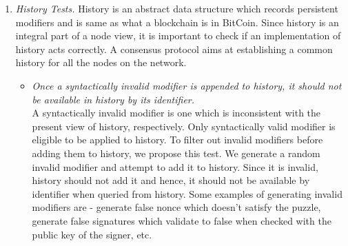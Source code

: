 \begin{enumerate}[\IEEEsetlabelwidth{Z}]
\item \textit{History Tests.}
History is an abstract data structure which records persistent modifiers and is same as what a blockchain is in BitCoin. Since history is an integral part of a node view, it is important to check if an implementation of history acts correctly. A consensus protocol aims at establishing a common history for all the nodes on the network.

\begin{itemize}[]
\item \textit{Once a syntactically invalid modifier is appended to history, it should not be available in history by its identifier.}\\
A syntactically invalid modifier is one which is inconsistent with the present view of history, respectively. Only syntactically valid modifier is eligible to be applied to history. To filter out invalid modifiers before adding them to history, we propose this test. We generate a random invalid modifier and attempt to add it to history. Since it is invalid, history should not add it and hence, it should not be available by identifier when queried from history. Some examples of generating invalid modifiers are - generate false nonce which doesn't satisfy the puzzle, generate false signatures which validate to false when checked with the public key of the signer, etc.


\end{itemize}
\end{enumerate}
